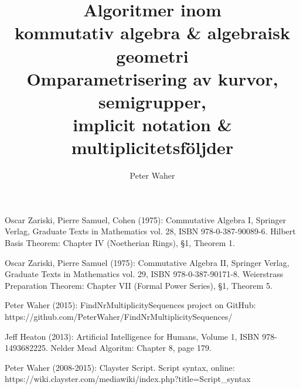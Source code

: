 \documentclass[twoside]{report}
\title{Algoritmer inom \\
	kommutativ algebra \& algebraisk geometri \\[20pt]
	\large Omparametrisering av kurvor, semigrupper, \\
	implicit notation \& multiplicitetsföljder}
\author{Peter Waher}
\begin{document}
\maketitle

\begin{abstract}
\end{abstract}

\tableofcontents{}







\appendix{}






\begin{thebibliography}{99}
 Oscar Zariski, Pierre Samuel, Cohen (1975): Commutative Algebra I, Springer Verlag, Graduate Texts in Mathematics vol. 28, ISBN 978-0-387-90089-6. Hilbert Basis Theorem: Chapter IV (Noetherian Rings), §1, Theorem 1.

 Oscar Zariski, Pierre Samuel (1975): Commutative Algebra II, Springer Verlag, Graduate Texts in Mathematics vol. 29, ISBN 978-0-387-90171-8. Weierstrass Preparation Theorem: Chapter VII (Formal Power Series), §1, Theorem 5.

 Peter Waher (2015): FindNrMultiplicitySequences project on GitHub: https://github.com/PeterWaher/FindNrMultiplicitySequences/

 Jeff Heaton (2013): Artificial Intelligence for Humans, Volume 1, ISBN 978-1493682225. Nelder Mead Algoritm: Chapter 8, page 179.

 Peter Waher (2008-2015): Clayster Script. Script syntax, online: https://wiki.clayster.com/mediawiki/index.php?title=Script\_syntax

\end{thebibliography}
\end{document}
